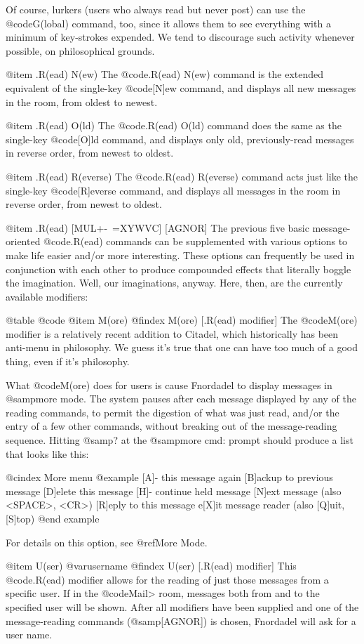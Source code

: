 Of course, lurkers (users who always read but never post) can
use the @code{G(lobal)} command, too, since it allows them to see everything
with a minimum of key-strokes expended.  We tend to discourage such
activity whenever possible, on philosophical grounds.

@item .R(ead) N(ew)
The @code{.R(ead) N(ew)} command is the extended equivalent of the
single-key @code{[N]ew} command, and displays all new messages in the room,
from oldest to newest.

@item .R(ead) O(ld)
The @code{.R(ead) O(ld)} command does the same as the single-key
@code{[O]ld} command, and displays only old, previously-read messages in
reverse order, from newest to oldest.

@item .R(ead) R(everse)
The @code{.R(ead) R(everse)} command acts just like the
single-key @code{[R]everse} command, and displays all messages in the room in
reverse order, from newest to oldest.

@item .R(ead) [MUL+-~=XYWVC] [AGNOR]
The previous five basic message-oriented @code{.R(ead)} commands can
be supplemented with various options to make life easier and/or more
interesting.  These options can frequently be used in conjunction with
each other to produce compounded effects that literally boggle the
imagination.  Well, our imaginations, anyway.  Here, then, are
the currently available modifiers:

@table @code
@item M(ore)
@findex M(ore) [.R(ead) modifier]
The @code{M(ore)} modifier is a relatively recent addition to
Citadel, which historically has been anti-menu in philosophy.
We guess it's true that one can have too much of a good thing,
even if it's philosophy.

What @code{M(ore)} does for users is cause Fnordadel to display
messages in @samp{more} mode.  The system pauses after each message
displayed by any of the reading commands, to permit the digestion of
what was just read, and/or the entry of a few other commands, without
breaking out of the message-reading sequence.  Hitting @samp{?} at the
@samp{more cmd:} prompt should produce a list that looks like this:

@cindex More menu
@example
[A]- this message again
[B]ackup to previous message
[D]elete this message
[H]- continue held message
[N]ext message (also <SPACE>, <CR>)
[R]eply to this message
e[X]it message reader (also [Q]uit, [S]top)
@end example

For details on this option, see @ref{More Mode}.

@item U(ser) @var{username}
@findex U(ser) [.R(ead) modifier]
This @code{.R(ead)} modifier allows for the reading of just
those messages from a specific user.  If in the @code{Mail>} room,
messages both from and to the specified user will be shown.
After all modifiers have been supplied and one of the message-reading
commands (@samp{[AGNOR]}) is chosen, Fnordadel will ask for a
user name.

